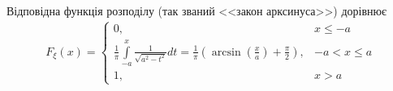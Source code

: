 \begin{example}
\begin{enumerate}
        Відповідна функція розподілу (так званий <<закон арксинуса>>) дорівнює
        \begin{gather*}
            F_\xi(x) = \begin{cases}
                0, & x\leq -a \\
                \frac{1}{\pi}\int\limits_{-a}^x \frac{1}{\sqrt{a^2-t^2}} dt = 
                \frac{1}{\pi}\left(\arcsin\left(\frac{x}{a}\right) + \frac{\pi}{2}\right), & -a < x \leq a \\
                1, & x > a
            \end{cases}
        \end{gather*}
    \end{enumerate}
\end{example}